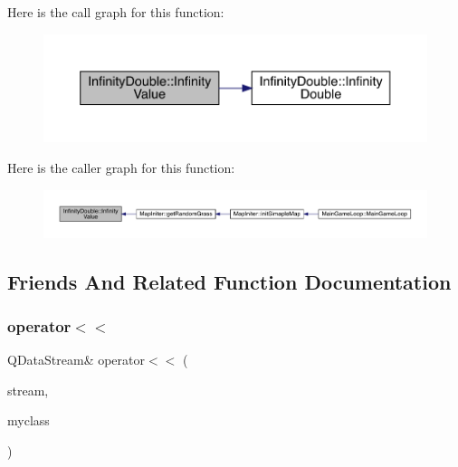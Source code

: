 Here is the call graph for this function\+:
\nopagebreak
\begin{figure}[H]
\begin{center}
\leavevmode
\includegraphics[width=350pt]{d6/d7d/a00161_a67fae871f96708313bedc644630ac8bc_cgraph}
\end{center}
\end{figure}
Here is the caller graph for this function\+:
\nopagebreak
\begin{figure}[H]
\begin{center}
\leavevmode
\includegraphics[width=350pt]{d6/d7d/a00161_a67fae871f96708313bedc644630ac8bc_icgraph}
\end{center}
\end{figure}


\subsection{Friends And Related Function Documentation}
\mbox{\label{a00161_ac679f673051abba09b475da2f8aff522}} 
\subsubsection{\texorpdfstring{operator$<$$<$}{operator<<}}
{\footnotesize\ttfamily Q\+Data\+Stream\& operator$<$$<$ (\begin{DoxyParamCaption}\item[{Q\+Data\+Stream \&}]{stream,  }\item[{const \hyperlink{a00161}{Infinity\+Double} \&}]{myclass }\end{DoxyParamCaption})\hspace{0.3cm}{\ttfamily [friend]}}



